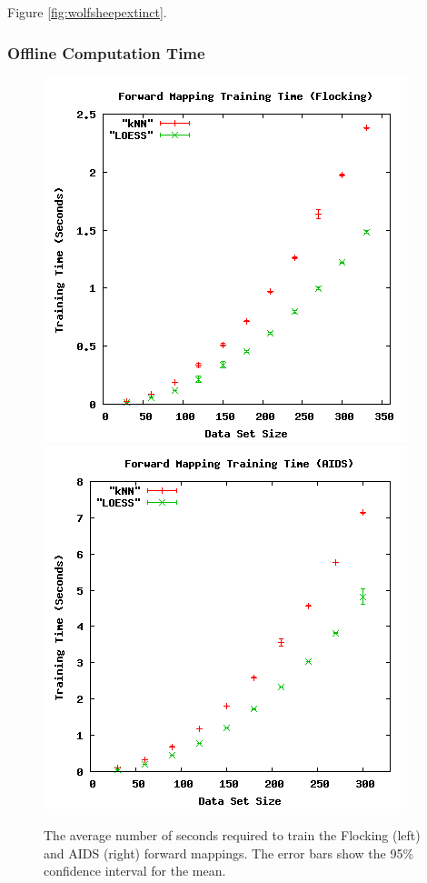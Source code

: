 Figure \ref{fig:wolfsheepextinct}.



  \subsubsection{Offline Computation Time}

\begin{figure}[ht]
\centering
\includegraphics[scale=.4]{images/results_flocking/fmtraining.png}
\includegraphics[scale=.4]{images/results_aids/aids-fmtraining.png}
\caption{The average number of seconds required to train the Flocking (left) and AIDS (right) forward mappings.
The error bars show the 95\% confidence interval for the mean.}
\label{fig:fmtraining}
\end{figure}

